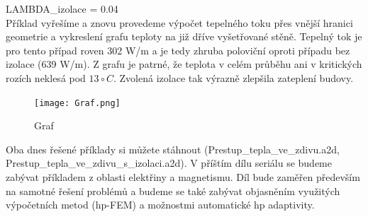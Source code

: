 \documentclass[a4paper, oneside]{article}
\begin{document}
LAMBDA\_izolace = 0.04\\
	
	Příklad vyřešíme a znovu provedeme výpočet tepelného toku přes vnější hranici geometrie a vykreslení grafu teploty na již dříve vyšetřované stěně. Tepelný tok je pro tento případ roven 302 W/m a je tedy zhruba poloviční oproti případu bez izolace (639 W/m). Z grafu je patrné, že teplota v celém průběhu ani v kritických rozích neklesá pod $13\circ C$. Zvolená izolace tak výrazně zlepšila zateplení budovy.\\
	
\begin{figure}[htbp]
\centering
\texttt{[image: Graf.png]}\\
\caption{Graf}
\end{figure}

	Oba dnes řešené příklady si můžete stáhnout (Prestup\_tepla\_ve\_zdivu.a2d,\\ Prestup\_tepla\_ve\_zdivu\_s\_izolaci.a2d). V příštím dílu seriálu se budeme zabývat příkladem z oblasti elektřiny a magnetismu. Díl bude zaměřen především na samotné řešení problémů a budeme se také zabývat objasněním využitých výpočetních metod (hp-FEM) a možnostmi automatické hp adaptivity.
\end{document}
